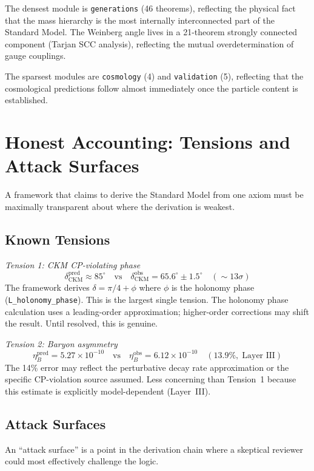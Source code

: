 \documentclass[11pt]{article}
\begin{document}
The densest module is \texttt{generations} (46 theorems), reflecting the physical fact that the mass hierarchy is the most internally interconnected part of the Standard Model.  The Weinberg angle lives in a 21-theorem strongly connected component (Tarjan SCC analysis), reflecting the mutual overdetermination of gauge couplings.

The sparsest modules are \texttt{cosmology} (4) and \texttt{validation} (5), reflecting that the cosmological predictions follow almost immediately once the particle content is established.


\section{Honest Accounting: Tensions and Attack Surfaces}

A framework that claims to derive the Standard Model from one axiom must be maximally transparent about where the derivation is weakest.

\subsection{Known Tensions}

\textit{Tension 1: CKM CP-violating phase}
\[
\delta_{\mathrm{CKM}}^{\mathrm{pred}} \approx 85^\circ \quad\text{vs}\quad \delta_{\mathrm{CKM}}^{\mathrm{obs}} = 65.6^\circ \pm 1.5^\circ \quad(\sim\!13\sigma)
\]
The framework derives $\delta = \pi/4 + \phi$ where $\phi$ is the holonomy phase (\texttt{L\_holonomy\_phase}).  This is the largest single tension.  The holonomy phase calculation uses a leading-order approximation; higher-order corrections may shift the result.  Until resolved, this is genuine.

\textit{Tension 2: Baryon asymmetry}
\[
\eta_B^{\mathrm{pred}} = 5.27\times 10^{-10} \quad\text{vs}\quad \eta_B^{\mathrm{obs}} = 6.12\times 10^{-10} \quad(13.9\%,\;\text{Layer III})
\]
The 14\% error may reflect the perturbative decay rate approximation or the specific CP-violation source assumed.  Less concerning than Tension~1 because this estimate is explicitly model-dependent (Layer~III).


\subsection{Attack Surfaces}

An ``attack surface'' is a point in the derivation chain where a skeptical reviewer could most effectively challenge the logic.
\end{document}
